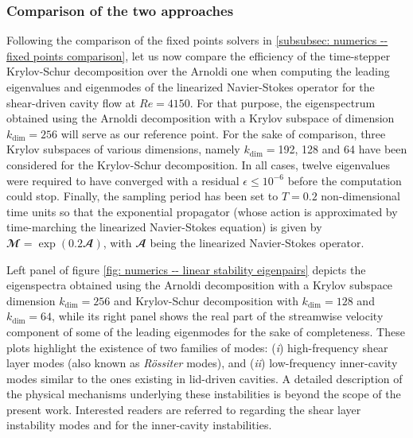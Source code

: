     \subsubsection{Comparison of the two approaches}
    \label{subsubsec: numerics -- comparison arnoldi krylov-schur}

    Following the comparison of the fixed points solvers in \textsection \ref{subsubsec: numerics -- fixed points comparison}, let us now compare the efficiency of the time-stepper Krylov-Schur decomposition over the Arnoldi one when computing the leading eigenvalues and eigenmodes of the linearized Navier-Stokes operator for the shear-driven cavity flow at $Re=4150$. For that purpose, the eigenspectrum obtained using the Arnoldi decomposition with a Krylov subspace of dimension $k_{\mathrm{dim}}=256$ will serve as our reference point. For the sake of comparison, three Krylov subspaces of various dimensions, namely $k_{\mathrm{dim}}=$192, 128 and 64 have been considered for the Krylov-Schur decomposition. In all cases, twelve eigenvalues were required to have converged with a residual $\epsilon \le 10^{-6}$ before the computation could stop. Finally, the sampling period has been set to $T = 0.2$ non-dimensional time units so that the exponential propagator (whose action is approximated by time-marching the linearized Navier-Stokes equation) is given by $\mathbfcal{M} = \exp \left( 0.2 \mathbfcal{A} \right)$, with $\mathbfcal{A}$ being the linearized Navier-Stokes operator.

    Left panel of figure \ref{fig: numerics -- linear stability eigenpairs} depicts the eigenspectra obtained using the Arnoldi decomposition with a Krylov subspace dimension $k_{\mathrm{dim}}=256$ and Krylov-Schur decomposition with $k_{\mathrm{dim}}=128$ and $k_{\mathrm{dim}}=64$, while its right panel shows the real part of the streamwise velocity component of some of the leading eigenmodes for the sake of completeness. These plots highlight the existence of two families of modes: (\textit{i}) high-frequency shear layer modes (also known as \emph{R\"ossiter} modes), and (\textit{ii}) low-frequency inner-cavity modes similar to the ones existing in lid-driven cavities. A detailed description of the physical mechanisms underlying these instabilities is beyond the scope of the present work. Interested readers are referred to \cite{BLLFD2011} regarding the shear layer instability modes and \cite{FALP2007,FPLFB2009} for the inner-cavity instabilities.

